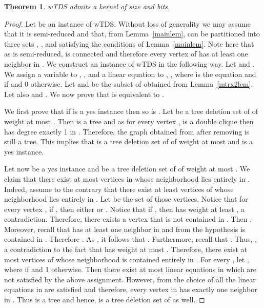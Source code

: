 \documentclass[a4paper,11pt]{article}
\newtheorem{theorem}{Theorem}
\begin{document}
\begin{theorem} 
{\sc wTDS} admits a kernel of size  and   bits.
\end{theorem}
\begin{proof}
Let  be an instance of {\sc wTDS}. Without loss of generality we may assume that it is semi-reduced and that, 
from Lemma~\ref{mainlem},  can be partitioned into 
three sets , , and  satisfying the conditions of Lemma~\ref{mainlem}. Note here that as  is semi-reduced,  is connected and therefore
every vertex of  has at least one neighbor in .
We construct an instance  of {\sc wTDS} in the following way.
Let  and . We assign a variable  to , , and a linear equation 
to , , where  is the equation  and  if  
and 0 otherwise. Let  and  be the subset of  obtained from Lemma~\ref{mtrx2lem}. 
Let also  and . We now prove that  is equivalent to . 

We first prove that if  is a yes instance then so is .
Let  be a tree deletion set of  of weight at most . Then  is a tree and as for every vertex , 
 is a double clique then  has degree exactly 1 in . Therefore, the graph obtained from  
after removing  is still a tree. This implies that  is a tree deletion
set of  of weight at most  and  is a yes instance.

Let now  be a yes instance and  be a tree deletion set of  of weight at most . 
We claim that there exist at most  vertices 
in  whose neighborhood lies entirely in . Indeed, assume to the contrary that there exist at least  vertices of  whose neighborhood lies
entirely in . Let  be the set of those vertices. Notice that for every vertex , if , then either  or 
.
Notice that if , then  has weight at least , a contradiction. Therefore, there exists a vertex  that is not contained in .
Then .  Moreover, recall that  has at least one neighbor  in  and from the hypothesis  is contained in . 
Therefore . As , it follows that . Furthermore, recall that 
. Thus, , a contradiction to the fact that  has weight at most .
Therefore, there exist at most  vertices of  whose neighborhood is contained entirely in .
For every , let , where  if  and 1 otherwise.
Then there exist at most  linear equations in  which are not satisfied by the above assignment. 
However, from the choice of  all the linear equations in  are satisfied and therefore, every vertex in  has exactly one 
neighbor in . Thus  is a tree and hence,  is a tree deletion set of  as well.


\end{proof}
\end{document}
